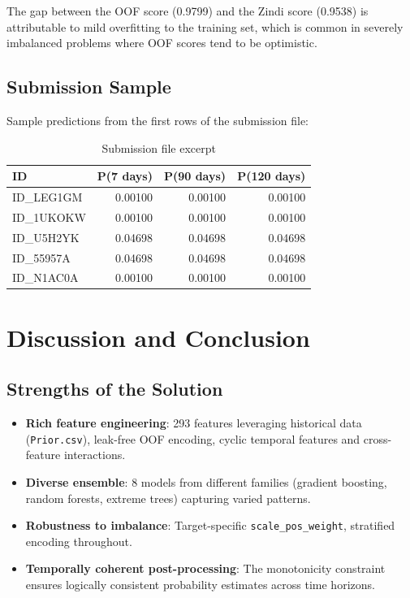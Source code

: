 \documentclass[12pt,a4paper]{article}
\begin{document}
The gap between the OOF score (0.9799) and the Zindi score (0.9538) is attributable to mild overfitting to the training set, which is common in severely imbalanced problems where OOF scores tend to be optimistic.

\subsection{Submission Sample}

Sample predictions from the first rows of the submission file:

\begin{table}[H]
\centering
\caption{Submission file excerpt}
\begin{tabular}{lrrr}
\toprule
\textbf{ID} & \textbf{P(7 days)} & \textbf{P(90 days)} & \textbf{P(120 days)} \\
\midrule
ID\_LEG1GM & 0.00100 & 0.00100 & 0.00100 \\
ID\_1UKOKW & 0.00100 & 0.00100 & 0.00100 \\
ID\_U5H2YK & 0.04698 & 0.04698 & 0.04698 \\
ID\_55957A & 0.04698 & 0.04698 & 0.04698 \\
ID\_N1AC0A & 0.00100 & 0.00100 & 0.00100 \\
\bottomrule
\end{tabular}
\end{table}

\section{Discussion and Conclusion}

\subsection{Strengths of the Solution}

\begin{itemize}
    \item \textbf{Rich feature engineering}: 293 features leveraging historical data (\texttt{Prior.csv}), leak-free OOF encoding, cyclic temporal features and cross-feature interactions.
    \item \textbf{Diverse ensemble}: 8 models from different families (gradient boosting, random forests, extreme trees) capturing varied patterns.
    \item \textbf{Robustness to imbalance}: Target-specific \texttt{scale\_pos\_weight}, stratified encoding throughout.
    \item \textbf{Temporally coherent post-processing}: The monotonicity constraint ensures logically consistent probability estimates across time horizons.
\end{itemize}
\end{document}
